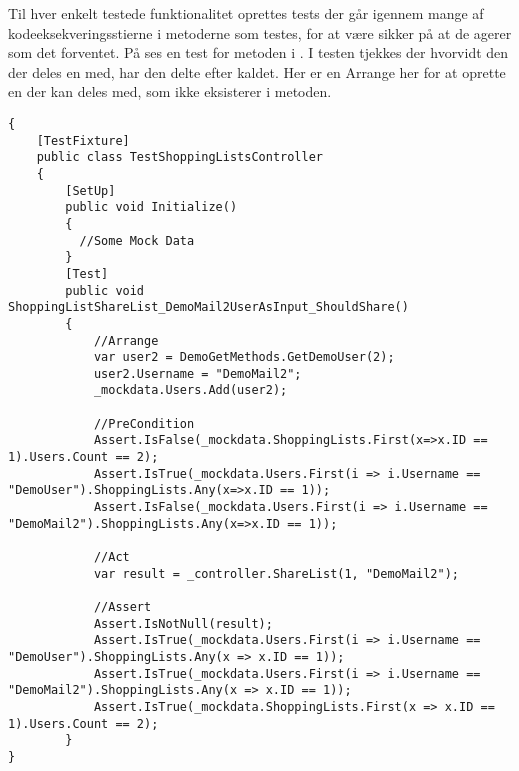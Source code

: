 Til hver enkelt testede funktionalitet oprettes tests der går igennem mange af kodeeksekveringsstierne i metoderne som testes, for at være sikker på at de agerer som det forventet.
På  ses en test for metoden  i . 
I testen tjekkes der hvorvidt den  der deles en  med, har den delte  efter kaldet.
Her er en Arrange her for at oprette en  der kan deles med, som ikke eksisterer i  metoden.

\begin{lstlisting}[caption={Test for metoden \class{ShareList}.}, label=lsttest]
{
    [TestFixture]
    public class TestShoppingListsController
    {
    	[SetUp]
        public void Initialize()
        {
          //Some Mock Data
        }
        [Test]
        public void ShoppingListShareList_DemoMail2UserAsInput_ShouldShare()
        {
            //Arrange
            var user2 = DemoGetMethods.GetDemoUser(2);
            user2.Username = "DemoMail2";
            _mockdata.Users.Add(user2); 

            //PreCondition
            Assert.IsFalse(_mockdata.ShoppingLists.First(x=>x.ID == 1).Users.Count == 2);
            Assert.IsTrue(_mockdata.Users.First(i => i.Username == "DemoUser").ShoppingLists.Any(x=>x.ID == 1));
            Assert.IsFalse(_mockdata.Users.First(i => i.Username == "DemoMail2").ShoppingLists.Any(x=>x.ID == 1));

            //Act
            var result = _controller.ShareList(1, "DemoMail2");

            //Assert
            Assert.IsNotNull(result);
            Assert.IsTrue(_mockdata.Users.First(i => i.Username == "DemoUser").ShoppingLists.Any(x => x.ID == 1));
            Assert.IsTrue(_mockdata.Users.First(i => i.Username == "DemoMail2").ShoppingLists.Any(x => x.ID == 1));
            Assert.IsTrue(_mockdata.ShoppingLists.First(x => x.ID == 1).Users.Count == 2);
        }
}        
\end{lstlisting}

